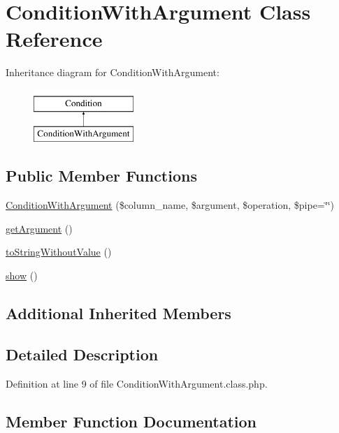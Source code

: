 \hypertarget{classConditionWithArgument}{}\section{Condition\+With\+Argument Class Reference}
\label{classConditionWithArgument}
Inheritance diagram for Condition\+With\+Argument\+:\begin{figure}[H]
\begin{center}
\leavevmode
\includegraphics[height=2.000000cm]{classConditionWithArgument}
\end{center}
\end{figure}
\subsection*{Public Member Functions}
\begin{DoxyCompactItemize}
\item 
\hyperlink{classConditionWithArgument_a2e5d396e44a1082e6a88ac52e8c5e63d}{Condition\+With\+Argument} (\$column\+\_\+name, \$argument, \$operation, \$pipe=\char`\"{}\char`\"{})
\item 
\hyperlink{classConditionWithArgument_a58a782b4a1f7eb6fd802f8b49750aeb7}{get\+Argument} ()
\item 
\hyperlink{classConditionWithArgument_adf2841f219b6bf3b96414c2c6100ce6c}{to\+String\+Without\+Value} ()
\item 
\hyperlink{classConditionWithArgument_a1624017983d96c85a7fc0b2a986b6e25}{show} ()
\end{DoxyCompactItemize}
\subsection*{Additional Inherited Members}


\subsection{Detailed Description}


Definition at line 9 of file Condition\+With\+Argument.\+class.\+php.



\subsection{Member Function Documentation}
\mbox{\label{classConditionWithArgument_a2e5d396e44a1082e6a88ac52e8c5e63d}} 
